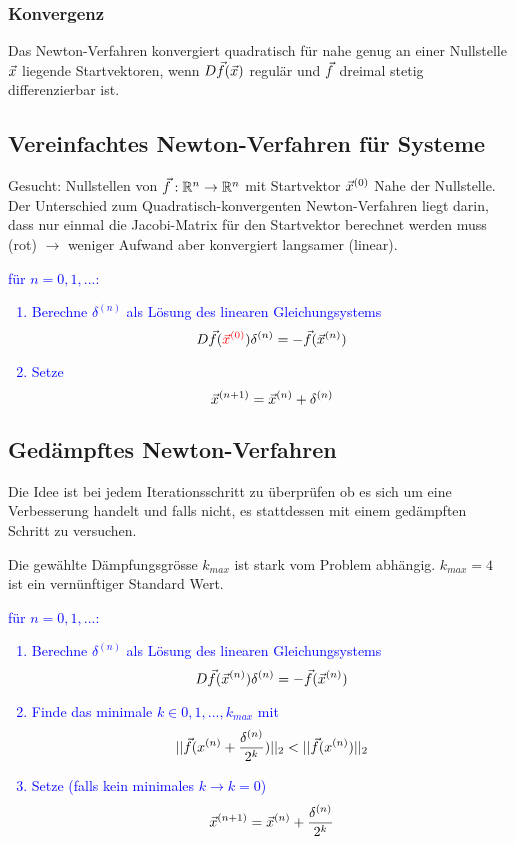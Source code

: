 \subsubsection{Konvergenz}

Das Newton-Verfahren konvergiert quadratisch für nahe genug an einer Nullstelle
$\vec x$ liegende Startvektoren, wenn $D\vec f(\vec x)$ regulär und $\vec f$ dreimal
stetig differenzierbar ist.







\subsection{Vereinfachtes Newton-Verfahren für Systeme}

Gesucht: Nullstellen von $\vec f : \mathbb{R}^n \to \mathbb{R}^n$ mit Startvektor $\vec x^{(0)}$
Nahe der Nullstelle.\\

Der Unterschied zum Quadratisch-konvergenten Newton-Verfahren liegt darin, dass
nur einmal die Jacobi-Matrix für den Startvektor berechnet werden muss (rot)
$\rightarrow$ weniger Aufwand aber konvergiert langsamer (linear).

\textcolor{blue}{
	\Large{
		für $n = 0, 1,...$:
		\begin{enumerate}
			\item Berechne $\delta^{(n)}$ als Lösung des linearen Gleichungsystems
			      $$ D\vec{f}( \textcolor{red}{ \vec x^{(0)} } ) \delta^{(n)} = - \vec f(\vec x^{(n)}) $$
			\item Setze
			      $$ \vec x^{(n+1)} = \vec x^{(n)} + \delta^{(n)} $$
		\end{enumerate}
	}
}



\subsection{Gedämpftes Newton-Verfahren}

Die Idee ist bei jedem Iterationsschritt zu überprüfen ob es sich um eine
Verbesserung handelt und falls nicht, es stattdessen mit einem gedämpften Schritt
zu versuchen.

Die gewählte Dämpfungsgrösse $k_{max}$ ist stark vom Problem abhängig.
\textcolor{PineGreen}{$k_{max} = 4$ ist ein vernünftiger Standard Wert.}


\textcolor{blue}{
	\Large{
		für $n = 0, 1,...$:
		\begin{enumerate}
			\item Berechne $\delta^{(n)}$ als Lösung des linearen Gleichungsystems
			      $$ D\vec{f}(\vec x^{(n)}) \delta^{(n)} = - \vec f(\vec x^{(n)}) $$
			\item Finde das minimale $k \in {0,1,...,k_{max}}$ mit
			      $$ || \vec f(x^{(n)} + \frac{\delta^{(n)}}{2^k}) ||_2
				      < || \vec f(x^{(n)}) ||_2  $$
			\item Setze (falls kein minimales $k \rightarrow k = 0$)
			      $$ \vec x^{(n+1)} = \vec x^{(n)} + \frac{ \delta^{(n)} }{ 2^{k} } $$
		\end{enumerate}
	}
}

